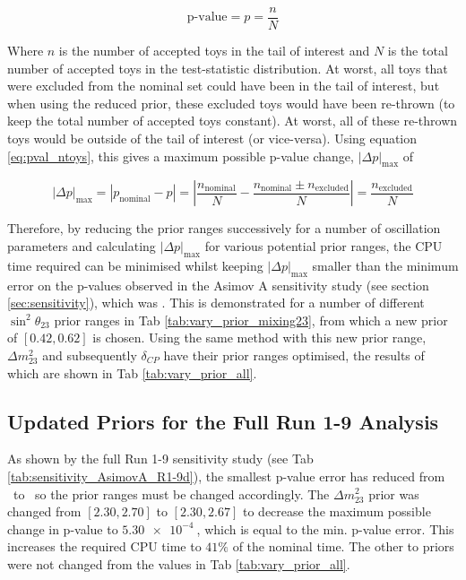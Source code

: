\begin{equation} \label{eq:pval_ntoys}
\textrm{p-value} = p = \frac{n}{N}
\end{equation}

Where $n$ is the number of accepted toys in the tail of interest and $N$ is the total number of accepted toys in the test-statistic distribution. At worst, all toys that were excluded from the nominal set could have been in the tail of interest, but when using the reduced prior, these excluded toys would have been re-thrown (to keep the total number of accepted toys constant). At worst, all of these re-thrown toys would be outside of the tail of interest (or vice-versa). Using equation \ref{eq:pval_ntoys}, this gives a maximum possible p-value change, $|\Delta p|_{\textrm{max}}$ of

\begin{equation} \label{eq:dpmax}
|\Delta p|_{\textrm{max}} 
= \left| p_{\textrm{nominal}} - p \right|
= \left| \frac{n_{\textrm{nominal}}}{N} - \frac{n_{\textrm{nominal}} \pm n_{\textrm{excluded}}}{N} \right|
= \frac{n_{\textrm{excluded}}}{N}
\end{equation}

Therefore, by reducing the prior ranges successively for a number of oscillation parameters and calculating $|\Delta p|_{\textrm{max}}$ for various potential prior ranges, the CPU time required can be minimised whilst keeping $|\Delta p|_{\textrm{max}}$ smaller than the minimum error on the p-values observed in the Asimov A sensitivity study (see section \ref{sec:sensitivity}), which was \minPvalErrorAsimovA. This is demonstrated for a number of different $\sin^2 \theta_{23}$ prior ranges in Tab \ref{tab:vary_prior_mixing23}, from which a new prior of $[0.42, 0.62]$ is chosen. Using the same method with this new prior range, $\Delta m^2_{23}$ and subsequently $\delta_{CP}$ have their prior ranges optimised, the results of which are shown in Tab \ref{tab:vary_prior_all}.




{\color{red} 

\subsection{Updated Priors for the Full Run 1-9 Analysis}\label{app:priors_Run1-9d}
As shown by the full Run 1-9 sensitivity study (see Tab \ref{tab:sensitivity_AsimovA_R1-9d}), the smallest p-value error has reduced from \minPvalErrorAsimovA\ to \minPvalErrorAsimovABetaZeroRunOneNineD\ so the prior ranges must be changed accordingly. The $\Delta m^2_{23}$ prior was changed from $[2.30, 2.70]$ to $[2.30, 2.67]$ to decrease the maximum possible change in p-value to $\SI{5.30e-4}{}$, which is equal to the min. p-value error. This increases the required CPU time to $41\%$ of the nominal time. The other to priors were not changed from the values in Tab \ref{tab:vary_prior_all}.

} %

